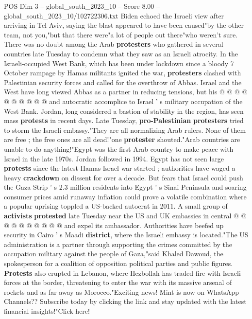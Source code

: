 \begin{textsample}{POS Dim 3 – global\_south\_2023\_10 – Score 8.00 – global\_south\_2023\_10/102722306.txt}
Biden echoed the Israeli view after arriving in Tel Aviv, saying the blast appeared to have been caused"by the other team, not you,"but that there were"a lot of people out there"who weren't sure.
There was no doubt among the Arab \textbf{protesters} who gathered in several countries late Tuesday to condemn what they saw as an Israeli atrocity.
In the Israeli-occupied West Bank, which has been under lockdown since a bloody 7 October rampage by Hamas militants ignited the war, \textbf{protesters} clashed with Palestinian security forces and called for the overthrow of Abbas.
Israel and the West have long viewed Abbas as a partner in reducing tensions, but his @ @ @ @ @ @ @ @ @ @ and autocratic accomplice to Israel ' s military occupation of the West Bank.
Jordan, long considered a bastion of stability in the region, has seen mass \textbf{protests} in recent days.
Late Tuesday, \textbf{pro-Palestinian} \textbf{protesters} tried to storm the Israeli embassy."They are all normalizing Arab rulers.
None of them are free ; the free ones are all dead!"one \textbf{protester} shouted."Arab countries are unable to do anything!"Egypt was the first Arab country to make peace with Israel in the late 1970s.
Jordan followed in 1994.
Egypt has not seen large \textbf{protests} since the latest Hamas-Israel war started ; authorities have waged a heavy \textbf{crackdown} on dissent for over a decade.
But fears that Israel could push the Gaza Strip ' s 2.3 million residents into Egypt ' s Sinai Peninsula and soaring consumer prices amid runaway inflation could prove a volatile combination where a popular uprising toppled a US-backed autocrat in 2011.
A small group of \textbf{activists} \textbf{protested} late Tuesday near the US and UK embassies in central @ @ @ @ @ @ @ @ @ @ and expel its ambassador.
Authorities have beefed up security in Cairo ' s Maadi \textbf{district}, where the Israeli embassy is located."The US administration is a partner through supporting the crimes committed by the occupation military against the people of Gaza,"said Khaled Dawoud, the spokesperson for a coalition of opposition political parties and public figures. \textbf{Protests} also erupted in Lebanon, where Hezbollah has traded fire with Israeli forces at the border, threatening to enter the war with its massive arsenal of rockets and as far away as Morocco."Exciting news!
Mint is now on WhatsApp Channels??
Subscribe today by clicking the link and stay updated with the latest financial insights!"Click here!

\end{textsample}
